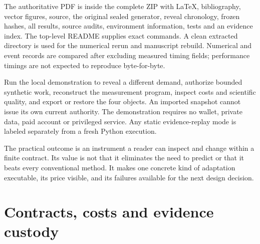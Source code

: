 \documentclass[11pt,letterpaper]{article}
\begin{document}
The authoritative PDF is inside the complete ZIP with LaTeX, bibliography, vector figures, source, the original sealed generator, reveal chronology, frozen hashes, all results, source audits, environment information, tests and an evidence index. The top-level README supplies exact commands. A clean extracted directory is used for the numerical rerun and manuscript rebuild. Numerical and event records are compared after excluding measured timing fields; performance timings are not expected to reproduce byte-for-byte.

Run the local demonstration to reveal a different demand, authorize bounded synthetic work, reconstruct the measurement program, inspect costs and scientific quality, and export or restore the four objects. An imported snapshot cannot issue its own current authority. The demonstration requires no wallet, private data, paid account or privileged service. Any static evidence-replay mode is labeled separately from a fresh Python execution.

The practical outcome is an instrument a reader can inspect and change within a finite contract. Its value is not that it eliminates the need to predict or that it beats every conventional method. It makes one concrete kind of adaptation executable, its price visible, and its failures available for the next design decision.


\appendix
\section{Contracts, costs and evidence custody}
\end{document}
